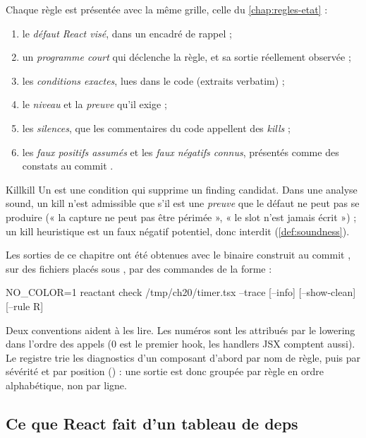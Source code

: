 Chaque règle est présentée avec la même grille, celle du \cref{chap:regles-etat} :
\begin{enumerate}
  \item le \emph{défaut React visé}, dans un encadré de rappel ;
  \item un \emph{programme court} qui déclenche la règle, et sa sortie réellement observée ;
  \item les \emph{conditions exactes}, lues dans le code (extraits verbatim) ;
  \item le \emph{niveau} et la \emph{preuve} qu'il exige ;
  \item les \emph{silences}, que les commentaires du code appellent des \emph{kills} ;
  \item les \emph{faux positifs assumés} et les \emph{faux négatifs connus}, présentés comme des constats au commit \snapshotCommit.
\end{enumerate}

\begin{definition}{Kill}{kill}
Un  est une condition qui supprime un finding candidat. Dans une analyse sound, un kill n'est admissible que s'il est une \emph{preuve} que le défaut ne peut pas se produire (« la capture ne peut pas être périmée », « le slot n'est jamais écrit ») ; un kill heuristique est un faux négatif potentiel, donc interdit (\cref{def:soundness}).
\end{definition}

Les sorties de ce chapitre ont été obtenues avec le binaire construit au commit \snapshotCommit, sur des fichiers placés sous , par des commandes de la forme :
\begin{shell}
NO_COLOR=1 reactant check /tmp/ch20/timer.tsx --trace [--info] [--show-clean] [--rule R]
\end{shell}
Deux conventions aident à les lire. Les numéros \code{[hook:N]} sont les  attribués par le lowering dans l'ordre des appels (0 est le premier hook, les handlers JSX  comptent aussi). Le registre trie les diagnostics d'un composant d'abord par nom de règle, puis par sévérité et par position () : une sortie est donc groupée par règle en ordre alphabétique, non par ligne.

\subsection{Ce que React fait d'un tableau de deps}

